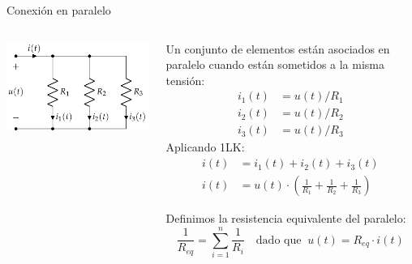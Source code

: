 \documentclass[aspectratio=169, xcolor={usenames,svgnames,dvipsnames}]{beamer}
\begin{document}

\begin{frame}{Conexión en paralelo}
    \begin{columns}
    \begin{column}{0.4\columnwidth}
        \vspace{-10mm}
        \begin{center}
        \includegraphics[width=1\linewidth]{../figs/AsociacionParalelo.pdf}
        \end{center}
    \end{column}
    \begin{column}{0.6\columnwidth}
        Un conjunto de elementos están asociados en paralelo cuando están sometidos a la \alert{misma tensión}:
        \vspace{-2mm}
        \begin{align*}      
          i_1(t) &= u(t)/R_1\\
          i_2(t) &= u(t)/R_2\\
          i_3(t) &= u(t)/R_3      
        \end{align*}    
        \vspace{-2mm}
        Aplicando \alert{1LK}:
        \begin{align*} 
            i(t)& = i_1(t) + i_2(t) + i_3(t) \\
            i(t) &= u(t) \cdot \left(\frac{1}{R_1} + \frac{1}{R_2} + \frac{1}{R_3}\right)
        \end{align*}    
    
        Definimos la \alert{resistencia equivalente} del paralelo:
        \[
          \boxed{\frac{1}{R_{eq}} = \sum_{i = 1}^n \frac{1}{R_i}} \quad \textrm{dado que} \;\; u(t) = R_{eq} \cdot i(t)
        \]
    \end{column}
    \end{columns}
\end{frame}
\end{document}
